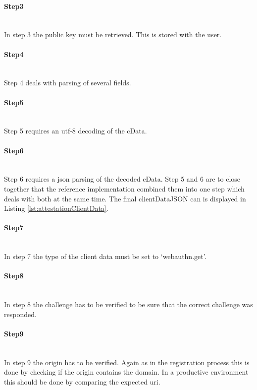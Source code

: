\documentclass[a4paper, 11pt]{scrartcl}
\begin{document}
\paragraph{Step3}\hfill \\ 
In step 3 the public key must be retrieved. This is stored with the user.

\paragraph{Step4}\hfill \\ 
Step 4 deals with parsing of several fields. 

\paragraph{Step5}\hfill \\ 
Step 5 requires an \gls{utf-8} decoding of the cData.

\paragraph{Step6}\hfill \\ 
Step 6 requires a \gls{json} parsing of the decoded cData. Step 5 and 6 are to close together that the reference implementation combined them into one step which deals with both at the same time. The final clientDataJSON can is displayed in Listing \ref{lst:attestationClientData}.



\paragraph{Step7}\hfill \\ 
In step 7 the type of the client data must be set to `webauthn.get'.

\paragraph{Step8}\hfill \\ 
In step 8 the challenge has to be verified to be sure that the correct challenge was responded.

\paragraph{Step9}\hfill \\ 
In step 9 the origin has to be verified. Again as in the registration process this is done by checking if the origin contains the domain. In a productive environment this should be done by comparing the expected uri.
\end{document}
